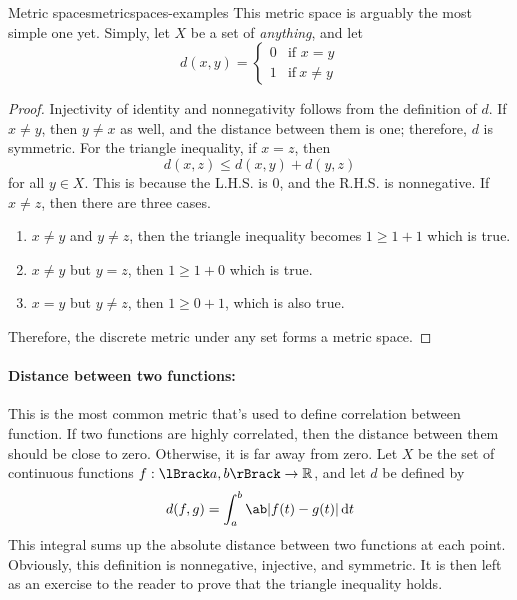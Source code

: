 \begin{exmp}{Metric spaces}{metricspaces-examples}
  This metric space is arguably the most simple one yet. Simply, let \(X\) be a set of
  \emph{anything}, and let
  \begin{equation}
    d(x, y) = \begin{cases}
                0 & \textrm{if } x = y    \\
                1 & \textrm{if}~ x \neq y
              \end{cases}
  \end{equation}
  \begin{proof}
    Injectivity of identity and nonnegativity follows from the definition of \(d\).
    If \(x \neq y\), then \(y \neq x\) as well, and the distance between them is one;
    therefore, \(d\) is symmetric. For the triangle inequality, if \(x = z\), then
    \begin{equation}
      d(x, z) \leq d(x, y) + d(y, z)
    \end{equation}
    for all \(y \in X\). This is because the L.H.S. is \(0\), and the R.H.S. is
    nonnegative. If \(x \neq z\), then there are three cases.
    \begin{enumerate}[noitemsep]
      \item \(x \neq y\) and \(y \neq z\), then the triangle inequality becomes
            \(1 \geq 1 + 1\) which is true.
      \item \(x \neq y\) but \(y = z\), then \(1 \geq 1 + 0\) which is true.
      \item \(x = y\) but \(y \neq z\), then \(1 \geq 0 + 1\), which is also true.
    \end{enumerate}
    Therefore, the discrete metric under any set forms a metric space.
  \end{proof}

  \paragraph{Distance between two functions:}

  This is the most common metric that's used to define correlation between function. If
  two functions are highly correlated, then the distance between them should be close
  to zero. Otherwise, it is far away from zero. Let \(X\) be the set of continuous
  functions \(f: \lBrack a, b \rBrack \appr \mathbb{R}\), and let \(d\) be defined by
  \begin{equation}
    d(f, g) = \int_a^b \ab|f(t) - g(t)| \odif{t}
  \end{equation}
  This integral sums up the absolute distance between two functions at each point.
  Obviously, this definition is nonnegative, injective, and symmetric. It is then left
  as an exercise to the reader to prove that the triangle inequality holds.


\end{exmp}

